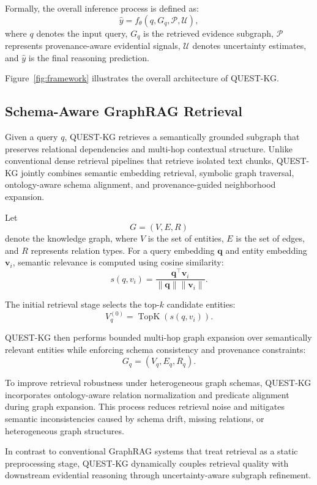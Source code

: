 \documentclass[sigconf,review,anonymous]{acmart}
\begin{document}
Formally, the overall inference process is defined as:
\[
\hat{y}
=
f_{\theta}(q,G_q,\mathcal{P},\mathcal{U}),
\]
where $q$ denotes the input query, $G_q$ is the retrieved evidence subgraph, $\mathcal{P}$ represents provenance-aware evidential signals, $\mathcal{U}$ denotes uncertainty estimates, and $\hat{y}$ is the final reasoning prediction.

Figure~\ref{fig:framework} illustrates the overall architecture of QUEST-KG.

\subsection{Schema-Aware GraphRAG Retrieval}

Given a query $q$, QUEST-KG retrieves a semantically grounded subgraph that preserves relational dependencies and multi-hop contextual structure. Unlike conventional dense retrieval pipelines that retrieve isolated text chunks, QUEST-KG jointly combines semantic embedding retrieval, symbolic graph traversal, ontology-aware schema alignment, and provenance-guided neighborhood expansion.

Let
\[
G=(V,E,R)
\]
denote the knowledge graph, where $V$ is the set of entities, $E$ is the set of edges, and $R$ represents relation types. For a query embedding $\mathbf{q}$ and entity embedding $\mathbf{v}_i$, semantic relevance is computed using cosine similarity:
\[
s(q,v_i)
=
\frac{
\mathbf{q}^{\top}\mathbf{v}_i
}{
\|\mathbf{q}\|\|\mathbf{v}_i\|
}.
\]

The initial retrieval stage selects the top-$k$ candidate entities:
\[
V_q^{(0)}
=
\operatorname{TopK}
\left(
s(q,v_i)
\right).
\]

QUEST-KG then performs bounded multi-hop graph expansion over semantically relevant entities while enforcing schema consistency and provenance constraints:
\[
G_q=(V_q,E_q,R_q).
\]

To improve retrieval robustness under heterogeneous graph schemas, QUEST-KG incorporates ontology-aware relation normalization and predicate alignment during graph expansion. This process reduces retrieval noise and mitigates semantic inconsistencies caused by schema drift, missing relations, or heterogeneous graph structures.

In contrast to conventional GraphRAG systems that treat retrieval as a static preprocessing stage, QUEST-KG dynamically couples retrieval quality with downstream evidential reasoning through uncertainty-aware subgraph refinement.
\end{document}
